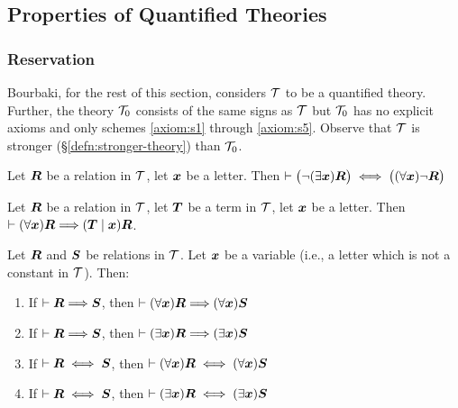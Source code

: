 \subsection{Properties of Quantified Theories}

\subsubsection{Reservation}
Bourbaki, for the rest of this section, considers $\mathcal{T}$ to be a
quantified theory. Further, the theory $\mathcal{T}_{0}$ consists of the
same signs as $\mathcal{T}$ but $\mathcal{T}_{0}$ has no explicit axioms
and only schemes \ref{axiom:s1} through \ref{axiom:s5}. Observe that
$\mathcal{T}$ is stronger (\S\ref{defn:stronger-theory}) than $\mathcal{T}_{0}$.

\begin{dc}\label{c29}%
Let $\boldsymbol{R}$ be a relation in $\mathcal{T}$, let
$\boldsymbol{x}$ be a letter. Then $\vdash\bigl(\neg(\exists\boldsymbol{x})\boldsymbol{R}\bigr)\iff\bigl((\forall\boldsymbol{x})\neg\boldsymbol{R}\bigr)$
\end{dc}

\begin{dc}\label{c30}%
Let $\boldsymbol{R}$ be a relation in $\mathcal{T}$, let
$\boldsymbol{T}$ be a term in $\mathcal{T}$, let $\boldsymbol{x}$ be
a letter. Then $\vdash(\forall\boldsymbol{x})\boldsymbol{R}\Longrightarrow(\boldsymbol{T}\mid\boldsymbol{x})\boldsymbol{R}$.
\end{dc}

\begin{dc}\label{c31}%
Let $\boldsymbol{R}$ and $\boldsymbol{S}$ be relations in $\mathcal{T}$.
Let $\boldsymbol{x}$ be a variable (i.e., a letter which is not a
constant in $\mathcal{T}$). Then:
\begin{enumerate}
\item If $\vdash\boldsymbol{R}\Longrightarrow\boldsymbol{S}$, then $\vdash(\forall\boldsymbol{x})\boldsymbol{R}\Longrightarrow(\forall\boldsymbol{x})\boldsymbol{S}$
\item If $\vdash\boldsymbol{R}\Longrightarrow\boldsymbol{S}$, then $\vdash(\exists\boldsymbol{x})\boldsymbol{R}\Longrightarrow(\exists\boldsymbol{x})\boldsymbol{S}$
\item If $\vdash\boldsymbol{R}\iff\boldsymbol{S}$, then $\vdash(\forall\boldsymbol{x})\boldsymbol{R}\iff(\forall\boldsymbol{x})\boldsymbol{S}$
\item If $\vdash\boldsymbol{R}\iff\boldsymbol{S}$, then $\vdash(\exists\boldsymbol{x})\boldsymbol{R}\iff(\exists\boldsymbol{x})\boldsymbol{S}$
\end{enumerate}
\end{dc}

